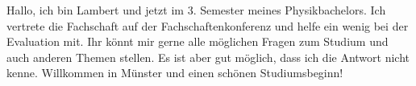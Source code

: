 \begin{multicols}{2}
{
Hallo, ich bin Lambert und jetzt im 3. Semester meines Physikbachelors. Ich vertrete die Fachschaft auf der Fachschaftenkonferenz und helfe ein wenig bei der Evaluation mit. 
Ihr könnt mir gerne alle möglichen Fragen zum Studium und auch anderen Themen stellen. Es ist aber gut möglich, dass ich die Antwort nicht kenne. 
Willkommen in Münster und einen schönen Studiumsbeginn!
}


\end{multicols}

